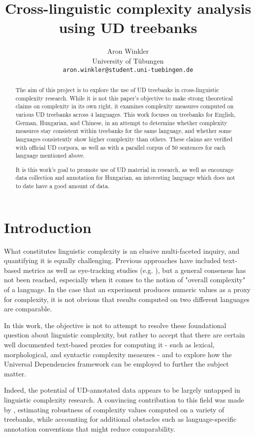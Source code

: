 \documentclass[11pt]{article}
\title{Cross-linguistic complexity analysis using UD treebanks}
\author{Aron Winkler \\
  University of Tübungen \\
  \texttt{aron.winkler@student.uni-tuebingen.de}}
\begin{document}
\maketitle
\begin{abstract}
    The aim of this project is to explore the use of UD treebanks in cross-linguistic complexity research. While it is not this paper's objective to make strong theoretical claims on complexity in its own right, it examines complexity measures computed on various UD treebanks across 4 languages. This work focuses on treebanks for English, German, Hungarian, and Chinese, in an attempt to determine whether complexity measures stay consistent within treebanks for the same language, and whether some languages consistently show higher complexity than others. These claims are verified with official UD corpora, as well as with a parallel corpus of 50 sentences for each language mentioned above.

    It is this work's goal to promote use of UD material in research, as well as encourage data collection and annotation for Hungarian, an interesting language which does not to date have a good amount of data.
\end{abstract}

\section{Introduction}

What constitutes linguistic complexity is an elusive multi-faceted inquiry, and quantifying it is equally challenging. Previous approaches have included text-based metrics as well as eye-tracking studies (e.g. \citealp{Lee:2007}), but a general consensus has not been reached, especially when it comes to the notion of "overall complexity" of a language. In the case that an experiment produces numeric values as a proxy for complexity, it is not obvious that results computed on two different languages are comparable.

In this work, the objective is not to attempt to resolve these foundational question about linguistic complexity, but rather to accept that there are certain well documented text-based proxies for computing it - such as lexical, morphological, and syntactic complexity measures - and to explore how the Universal Dependencies framework can be employed to further the subject matter. 

Indeed, the potential of UD-annotated data appears to be largely untapped in linguistic complexity research. A convincing contribution to this field was made by \citealp{berdicevskis-etal-2018-using}, estimating robustness of complexity values computed on a variety of treebanks, while accounting for additional obstacles such as language-specific annotation conventions that might reduce comparability.
\end{document}
